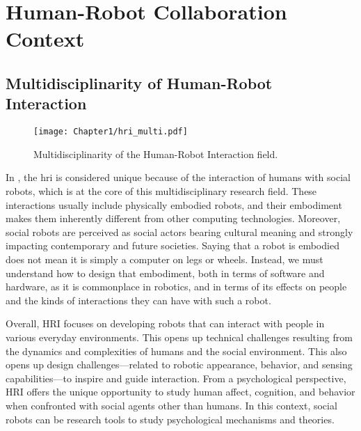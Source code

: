 \ifdefined{}
\else
\setcounter{chapter}{0}
\dominitoc
\faketableofcontents
\fi

\chapter{Human-Robot Collaboration Context}
\label{chap:1}
\minitoc




\section{Multidisciplinarity of Human-Robot Interaction}

\begin{figure}
    \center
    \texttt{[image: Chapter1/hri\_multi.pdf]}
    \caption{Multidisciplinarity of the Human-Robot Interaction field.}
    \label{fig:hri_multi}
\end{figure}

In \cite{bartneck_human_robot_2020}, the \acrfull{hri} is considered unique because of the interaction of humans with social robots, which is at the core of this multidisciplinary research field. These interactions usually include physically embodied robots, and their embodiment makes them inherently different from other computing technologies. Moreover, social robots are perceived as social actors bearing cultural meaning and strongly impacting contemporary and future societies. Saying that a robot is embodied does not mean it is simply a computer on legs or wheels. Instead, we must understand how to design that embodiment, both in terms of software and hardware, as it is commonplace in robotics, and in terms of its effects on people and the kinds of interactions they can have with such a robot.

Overall, HRI focuses on developing robots that can interact with people in various everyday environments. This opens up technical challenges resulting from the dynamics and complexities of humans and the social environment. This also opens up design challenges—related to robotic appearance, behavior, and sensing capabilities—to inspire and guide interaction. From a psychological perspective, HRI offers the unique opportunity to study human affect, cognition, and behavior when confronted with social agents other than humans. In this context, social robots can be research tools to study psychological mechanisms and theories.


